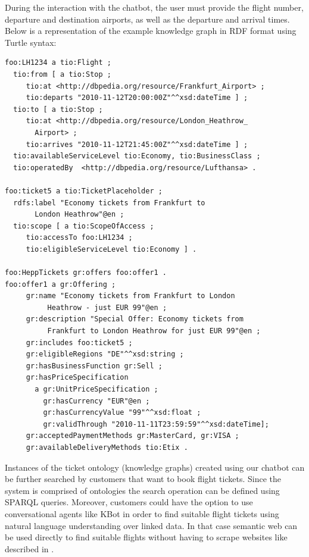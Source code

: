 \documentclass[runningheads]{llncs}
\begin{document}
\FloatBarrier
During the interaction with the chatbot, the user must provide the flight number, departure and destination airports, as well as the departure and arrival times.
Below is a representation of the example knowledge graph in RDF format using Turtle syntax:
\begin{lstlisting}[basicstyle=\small]
foo:LH1234 a tio:Flight ;
  tio:from [ a tio:Stop ;
     tio:at <http://dbpedia.org/resource/Frankfurt_Airport> ;
     tio:departs "2010-11-12T20:00:00Z"^^xsd:dateTime ] ;
  tio:to [ a tio:Stop ;
     tio:at <http://dbpedia.org/resource/London_Heathrow_
       Airport> ;
     tio:arrives "2010-11-12T21:45:00Z"^^xsd:dateTime ] ;
  tio:availableServiceLevel tio:Economy, tio:BusinessClass ;          
  tio:operatedBy  <http://dbpedia.org/resource/Lufthansa> .
            
foo:ticket5 a tio:TicketPlaceholder ;
  rdfs:label "Economy tickets from Frankfurt to
       London Heathrow"@en ;
  tio:scope [ a tio:ScopeOfAccess ;
     tio:accessTo foo:LH1234 ;
     tio:eligibleServiceLevel tio:Economy ] .

foo:HeppTickets gr:offers foo:offer1 .
foo:offer1 a gr:Offering ;
     gr:name "Economy tickets from Frankfurt to London
          Heathrow - just EUR 99"@en ;
     gr:description "Special Offer: Economy tickets from
          Frankfurt to London Heathrow for just EUR 99"@en ;
     gr:includes foo:ticket5 ;
     gr:eligibleRegions "DE"^^xsd:string ;
     gr:hasBusinessFunction gr:Sell ;
     gr:hasPriceSpecification
       a gr:UnitPriceSpecification ;
         gr:hasCurrency "EUR"@en ;
         gr:hasCurrencyValue "99"^^xsd:float ;
         gr:validThrough "2010-11-11T23:59:59"^^xsd:dateTime];
     gr:acceptedPaymentMethods gr:MasterCard, gr:VISA ;
     gr:availableDeliveryMethods tio:Etix .	
\end{lstlisting}
Instances of the ticket ontology (knowledge graphs) created using our chatbot can be further searched by customers that want to book flight tickets. Since the system is comprised of ontologies the search operation can be defined using SPARQL queries. Moreover, customers could have the option to use conversational agents like KBot\cite{ait2020kbot} in order to find suitable flight tickets using natural language understanding over linked data. In that case semantic web can be used directly to find suitable flights without having to scrape websites like described in \cite{turnip2019application}.        
   
\end{document}
